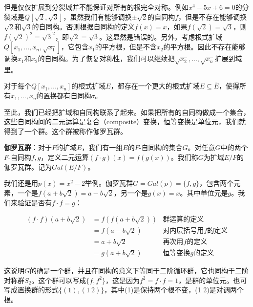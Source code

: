 \documentclass{article}
\begin{document}
但是仅仅扩展到分裂域并不能保证对所有的根完全对称。例如$x^4 - 5x + 6 = 0$的分裂域是$Q[\sqrt{2}, \sqrt{3}]$，虽然我们有能够调换$\pm \sqrt{2}$的自同构$f$，但是不存在能够调换$\sqrt{2}$和$\sqrt{3}$的自同构。否则根据自同构的定义$f(x) = x$，如果$f(\sqrt{2}) = \sqrt{3}$，则$f(\sqrt{2})^2 = \sqrt{3}^2$，即$\sqrt{2} = \sqrt{3}$。这显然是错误的。另外，考虑根式扩域$Q[x_1, ..., x_n, \sqrt{x_1}]$，它包含$x_1$的平方根，但是不含$x_2$的平方根。因此不存在能够调换$x_1$和$x_2$的自同构。为了恢复对称性，我们可以继续把$\sqrt{x_2}, ..., \sqrt{x_n}$扩展到域里。

\begin{theorem}
对于每个$Q[x_1, ..., x_n]$的根式扩域$E$，都存在一个更大的根式扩域$E \subseteq \overline{E}$，使得所有$x_1, ..., x_n$的置换都有自同构$\sigma$。
\end{theorem}

至此，我们已经把扩域和自同构联系了起来。如果把所有的自同构做成一个集合，这些自同构间的二元运算是复合（composite）变换，恒等变换是单位元，我们就得到了一个群。这个群被称作伽罗瓦群。

\begin{definition}
\textbf{伽罗瓦群}：对于$F$的扩域$E$，我们有一组$E$的$F$-自同构的集合$G$。对任意$G$中的两个$F$-自同构$f, g$，定义二元运算$(f \cdot g)(x) = f(g(x))$。我们称$G$为扩域$E/F$的伽罗瓦群。记为$Gal(E/F)$。
\end{definition}

我们还是用$p(x) = x^2 - 2$举例。伽罗瓦群$G = Gal(p) = \{f, g\}$，包含两个元素，一个是$f(a + b\sqrt{2}) = a - b\sqrt{2}$，另一个是$g(x) = x$。其中单位元是$g$。我们来验证是否有$f \cdot f = g$：

\[
\begin{array}{rll}
(f \cdot f)(a + b\sqrt{2}) & = f(f(a + b\sqrt{2})) & \text{群运算的定义} \\
  & = f(a - b\sqrt{2}) & \text{对内层括号用$f$的定义} \\
  & = a + b\sqrt{2} & \text{再次用$f$的定义} \\
  & = g(a + b\sqrt{2}) & \text{恒等变换$g$的定义}
\end{array}
\]

这说明$G$的确是一个群，并且在同构的意义下等同于二阶循环群，它也同构于二阶对称群$S_2$。这个群可以写成$\{f, f^2\}$，这是因为$f^2 = f \cdot f = 1$，是群的单位元。也可写成置换群的形式$\{(1), (1\ 2)\}$，其中(1)是保持两个根不变，(1 2)是对调两个根。

\begin{Exercise}
\end{Exercise}
\end{document}
